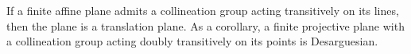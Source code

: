 If a finite affine plane admits a collineation group acting transitively on its lines, then the plane is a translation plane. As a corollary, a finite projective plane with a collineation group acting doubly transitively on its points is Desarguesian.
